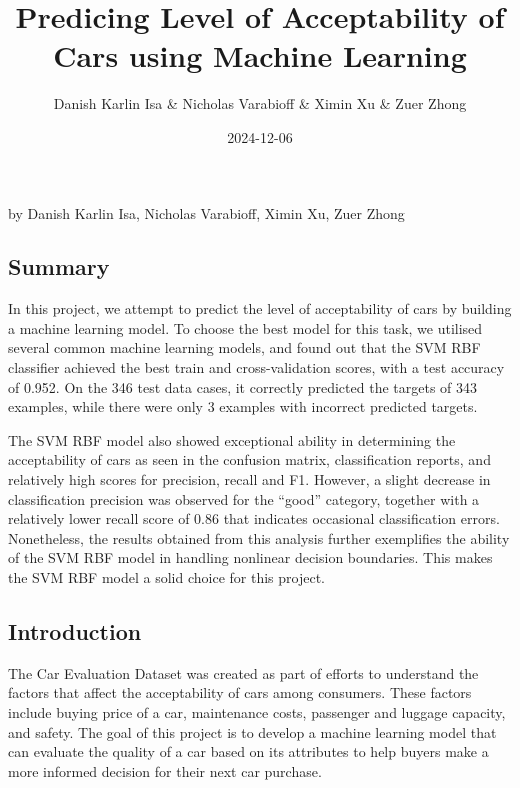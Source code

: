 \documentclass[
  letterpaper,
  DIV=11,
  numbers=noendperiod]{scrartcl}
\title{Predicing Level of Acceptability of Cars using Machine Learning}
\author{Danish Karlin Isa \& Nicholas Varabioff \& Ximin Xu \& Zuer
Zhong}
\date{2024-12-06}
\renewcommand*\contentsname{Table of contents}
\newcommand\contentsname{Table of contents}
\begin{document}
\maketitle

\renewcommand*\contentsname{Table of contents}
{
\hypersetup{linkcolor=}
\setcounter{tocdepth}{2}
\tableofcontents
}

by Danish Karlin Isa, Nicholas Varabioff, Ximin Xu, Zuer Zhong

\subsection{Summary}\label{summary}

In this project, we attempt to predict the level of acceptability of
cars by building a machine learning model. To choose the best model for
this task, we utilised several common machine learning models, and found
out that the SVM RBF classifier achieved the best train and
cross-validation scores, with a test accuracy of 0.952. On the 346 test
data cases, it correctly predicted the targets of 343 examples, while
there were only 3 examples with incorrect predicted targets.

The SVM RBF model also showed exceptional ability in determining the
acceptability of cars as seen in the confusion matrix, classification
reports, and relatively high scores for precision, recall and F1.
However, a slight decrease in classification precision was observed for
the ``good'' category, together with a relatively lower recall score of
0.86 that indicates occasional classification errors. Nonetheless, the
results obtained from this analysis further exemplifies the ability of
the SVM RBF model in handling nonlinear decision boundaries. This makes
the SVM RBF model a solid choice for this project.

\subsection{Introduction}\label{introduction}

The Car Evaluation Dataset was created as part of efforts to understand
the factors that affect the acceptability of cars among consumers. These
factors include buying price of a car, maintenance costs, passenger and
luggage capacity, and safety. The goal of this project is to develop a
machine learning model that can evaluate the quality of a car based on
its attributes to help buyers make a more informed decision for their
next car purchase.
\end{document}
